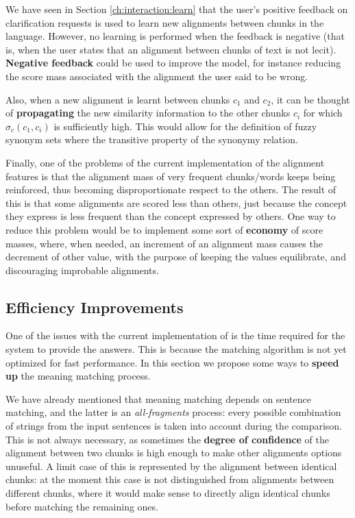 
We have seen in Section \ref{ch:interaction:learn} that the user's positive feedback on clarification requests is used to learn new alignments between chunks in the language. However, no learning is performed when the feedback is negative (that is, when the user states that an alignment between chunks of text is not lecit). \textbf{Negative feedback} could be used to improve the model, for instance reducing the score mass associated with the alignment the user said to be wrong.

Also, when a new alignment is learnt between chunks $c_1$ and $c_2$, it can be thought of \textbf{propagating} the new similarity information to the other chunks $c_i$ for which $\sigma_{c}(c_1,c_i)$ is sufficiently high. This would allow for the definition of fuzzy synonym sets where the transitive property of the synonymy relation.

Finally, one of the problems of the current implementation of the alignment features is that the alignment mass of very frequent chunks/words keeps being reinforced, thus becoming disproportionate respect to the others. The result of this is that some alignments are scored less than others, just because the concept they express is less frequent than the concept expressed by others. One way to reduce this problem would be to implement some sort of \textbf{economy} of score masses, where, when needed, an increment of an alignment mass causes the decrement of other value, with the purpose of keeping the values equilibrate, and discouraging improbable alignments.

\subsection{Efficiency Improvements}
One of the issues with the current implementation of \pname is the time required for the system to provide the answers. This is because the matching algorithm is not yet optimized for fast performance. In this section we propose some ways to \textbf{speed up} the meaning matching process.

We have already mentioned that meaning matching depends on sentence matching, and the latter is an \textit{all-fragments} process: every possible combination of strings from the input sentences is taken into account during the comparison. This is not always necessary, as sometimes the \textbf{degree of confidence} of the alignment between two chunks is high enough to make other alignments options unuseful. A limit case of this is represented by the alignment between identical chunks: at the moment this case is not distinguished  from alignments between different chunks, where it would make sense to directly align identical chunks before matching the remaining ones.

